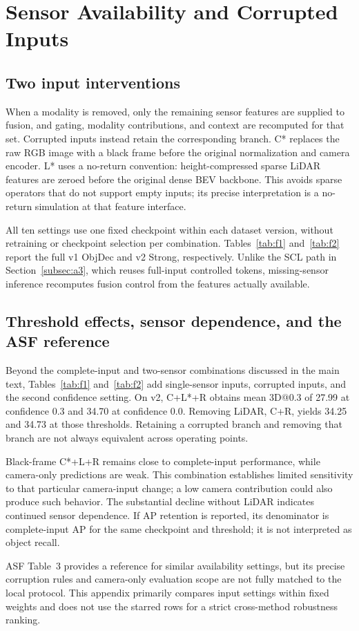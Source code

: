 \section{Sensor Availability and Corrupted Inputs}
\label{app:f}

\subsection{Two input interventions}
\label{subsec:f1}

When a modality is removed, only the remaining sensor features are supplied to fusion, and gating, modality contributions, and context are recomputed for that set. Corrupted inputs instead retain the corresponding branch. C* replaces the raw RGB image with a black frame before the original normalization and camera encoder. L* uses a no-return convention: height-compressed sparse LiDAR features are zeroed before the original dense BEV backbone. This avoids sparse operators that do not support empty inputs; its precise interpretation is a no-return simulation at that feature interface.

All ten settings use one fixed checkpoint within each dataset version, without retraining or checkpoint selection per combination. Tables~\ref{tab:f1} and~\ref{tab:f2} report the full v1 ObjDec and v2 Strong, respectively. Unlike the SCL path in Section~\ref{subsec:a3}, which reuses full-input controlled tokens, missing-sensor inference recomputes fusion control from the features actually available.

\subsection{Threshold effects, sensor dependence, and the ASF reference}
\label{subsec:f2}

Beyond the complete-input and two-sensor combinations discussed in the main text, Tables~\ref{tab:f1} and~\ref{tab:f2} add single-sensor inputs, corrupted inputs, and the second confidence setting. On v2, C+L*+R obtains mean 3D@0.3 of 27.99 at confidence 0.3 and 34.70 at confidence 0.0. Removing LiDAR, C+R, yields 34.25 and 34.73 at those thresholds. Retaining a corrupted branch and removing that branch are not always equivalent across operating points.

Black-frame C*+L+R remains close to complete-input performance, while camera-only predictions are weak. This combination establishes limited sensitivity to that particular camera-input change; a low camera contribution could also produce such behavior. The substantial decline without LiDAR indicates continued sensor dependence. If AP retention is reported, its denominator is complete-input AP for the same checkpoint and threshold; it is not interpreted as object recall.

ASF Table~3 \citep{paek2025asf} provides a reference for similar availability settings, but its precise corruption rules and camera-only evaluation scope are not fully matched to the local protocol. This appendix primarily compares input settings within fixed weights and does not use the starred rows for a strict cross-method robustness ranking.





